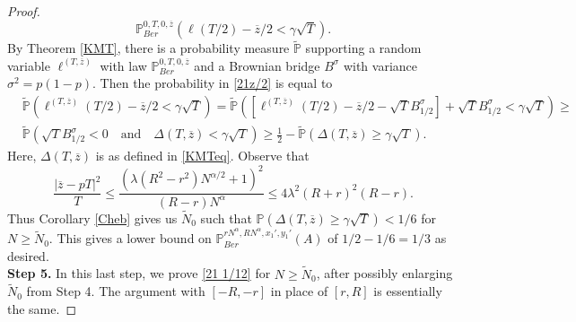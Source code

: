 \begin{proof}
		\begin{equation}\label{21z/2}
		\mathbb{P}^{0,T,0,\overline{z}}_{Ber}\left(\ell(T/2) - \overline{z}/2 < \gamma\sqrt{T}\right).
		\end{equation}
		By Theorem \ref{KMT}, there is a probability measure $\tilde{\mathbb{P}}$ supporting a random variable $\ell^{(T,\overline{z})}$ with law $\mathbb{P}^{0,T,0,\overline{z}}_{Ber}$ and a Brownian bridge $B^\sigma$ with variance $\sigma^2 = p(1-p)$. Then the probability in \eqref{21z/2} is equal to
		\begin{align*}
		& \tilde{\mathbb{P}}\left( \ell^{(T,\overline{z})}(T/2) - \overline{z}/2 < \gamma\sqrt{T}\right) = \tilde{\mathbb{P}}\left(\left[\ell^{(T,\overline{z})}(T/2) - \overline{z}/2 - \sqrt{T}B^\sigma_{1/2}\right] + \sqrt{T}B^\sigma_{1/2} < \gamma\sqrt{T}\right) \geq \\
		& \tilde{\mathbb{P}}\left(\sqrt{T}B^\sigma_{1/2} < 0\quad\mathrm{and}\quad \Delta(T,\overline{z}) < \gamma\sqrt{T}\right) \geq \frac{1}{2} - \tilde{\mathbb{P}}\left(\Delta(T,\overline{z}) \geq \gamma\sqrt{T}\right).
		\end{align*}
		Here, $\Delta(T,\overline{z})$ is as defined in \eqref{KMTeq}. Observe that
		\begin{equation}\label{21zpT}
		\frac{|\overline{z} - pT|^2}{T} \leq \frac{(\lambda(R^2-r^2) N^{\alpha/2} + 1)^2}{(R-r)N^\alpha} \leq 4\lambda^2(R+r)^2(R-r).
		\end{equation}
		Thus Corollary \ref{Cheb} gives us $\tilde{N}_0$ such that $\mathbb{P}(\Delta(T,\overline{z})\geq \gamma\sqrt{T})<1/6$ for $N\geq \tilde{N}_0$. This gives a lower bound on $\mathbb{P}^{rN^\alpha, RN^\alpha,x_1',y_1'}_{Ber} (A)$ of $1/2 - 1/6 = 1/3$ as desired.\\
		
		\noindent\textbf{Step 5.} In this last step, we prove \eqref{21 1/12} for $N\geq \tilde{N}_0$, after possibly enlarging $\tilde{N}_0$ from Step 4. The argument with $[-R,-r]$ in place of $[r,R]$ is essentially the same. 
		

\end{proof}
